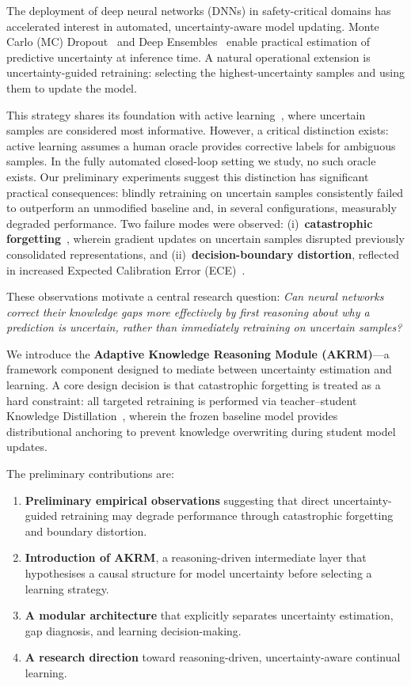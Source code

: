 \documentclass[conference]{IEEEtran}
\begin{document}
The deployment of deep neural networks (DNNs) in safety-critical domains has accelerated interest in automated, uncertainty-aware model updating. Monte Carlo (MC) Dropout~\cite{gal2016dropout} and Deep Ensembles~\cite{lakshminarayanan2017simple} enable practical estimation of predictive uncertainty at inference time. A natural operational extension is uncertainty-guided retraining: selecting the highest-uncertainty samples and using them to update the model.

This strategy shares its foundation with active learning~\cite{settles2009active}, where uncertain samples are considered most informative. However, a critical distinction exists: active learning assumes a human oracle provides corrective labels for ambiguous samples. In the fully automated closed-loop setting we study, no such oracle exists. Our preliminary experiments suggest this distinction has significant practical consequences: blindly retraining on uncertain samples consistently failed to outperform an unmodified baseline and, in several configurations, measurably degraded performance. Two failure modes were observed: (i)~\textbf{catastrophic forgetting}~\cite{kirkpatrick2017overcoming}, wherein gradient updates on uncertain samples disrupted previously consolidated representations, and (ii)~\textbf{decision-boundary distortion}, reflected in increased Expected Calibration Error (ECE)~\cite{guo2017calibration}.

These observations motivate a central research question: \emph{Can neural networks correct their knowledge gaps more effectively by first reasoning about why a prediction is uncertain, rather than immediately retraining on uncertain samples?}

We introduce the \textbf{Adaptive Knowledge Reasoning Module (AKRM)}---a framework component designed to mediate between uncertainty estimation and learning. A core design decision is that catastrophic forgetting is treated as a hard constraint: all targeted retraining is performed via teacher--student Knowledge Distillation~\cite{hinton2015distilling}, wherein the frozen baseline model provides distributional anchoring to prevent knowledge overwriting during student model updates.

The preliminary contributions are:
\begin{enumerate}
    \item \textbf{Preliminary empirical observations} suggesting that direct uncertainty-guided retraining may degrade performance through catastrophic forgetting and boundary distortion.
    \item \textbf{Introduction of AKRM}, a reasoning-driven intermediate layer that hypothesises a causal structure for model uncertainty before selecting a learning strategy.
    \item \textbf{A modular architecture} that explicitly separates uncertainty estimation, gap diagnosis, and learning decision-making.
    \item \textbf{A research direction} toward reasoning-driven, uncertainty-aware continual learning.
\end{enumerate}
\end{document}
